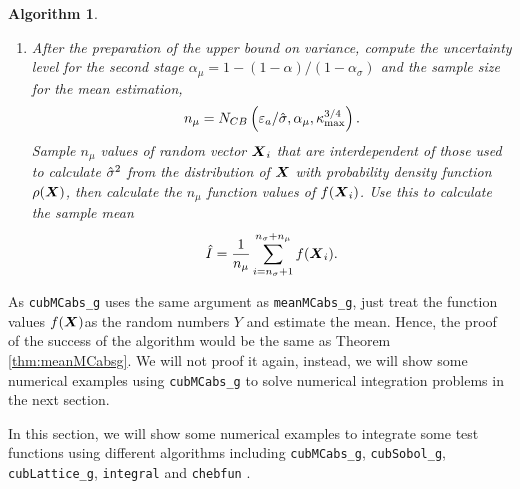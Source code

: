 \documentclass{iitthesis}
\newtheorem{algorithm}[theorem]{Algorithm}
\theoremstyle{definition}
\begin{document}
\begin{algorithm}
\begin{enumerate}
\item After the preparation of the upper bound on variance, compute the uncertainty level for the second stage $\alpha_\mu = 1-(1-\alpha)/(1-\alpha_{\sigma})$ and the sample size for the mean estimation,
\begin{align}\label{NCBmeanMCabs}
n_\mu = N_{CB} \left(\varepsilon_a/\hat{\sigma},\alpha_\mu, \kappa_{\max}^{3/4}\right).
\end{align}
Sample $n_\mu$ values of random vector $\boldsymbol{X}_i$ that are interdependent of those used to calculate $\hat{\sigma}^2$ from the distribution of $\boldsymbol{X}$ with probability density function $\rho(\boldsymbol{X})$, then calculate the $n_\mu$ function values of $f(\boldsymbol{X}_i)$. Use this to calculate the sample mean 
\begin{align}\label{hmun}
\hat{I}= \frac{1}{n_\mu}\sum_{i = n_\sigma+1}^{n_\sigma+n_\mu}f(\boldsymbol{X}_i).
\end{align}
\end{enumerate}
\end{algorithm}
As {\tt cubMCabs\_g} uses the same argument as {\tt meanMCabs\_g}, just treat the function values $f(\boldsymbol{X}) $as the random numbers $Y$ and estimate the mean. Hence, the proof of the success of the algorithm would be the same as Theorem \ref{thm:meanMCabsg}. We will not proof it again,  instead, we will show some numerical examples using {\tt cubMCabs\_g} to solve numerical integration problems in the next section.


In this section, we will show some numerical examples to integrate some test functions using different algorithms including {\tt cubMCabs\_g}, {\tt cubSobol\_g}\cite{HicJim16a}, {\tt cubLattice\_g}\cite{JimHic16a}, {\tt integral}\cite{Shampone08} and {\tt chebfun} \cite{Chebfun14}.
\end{document}
